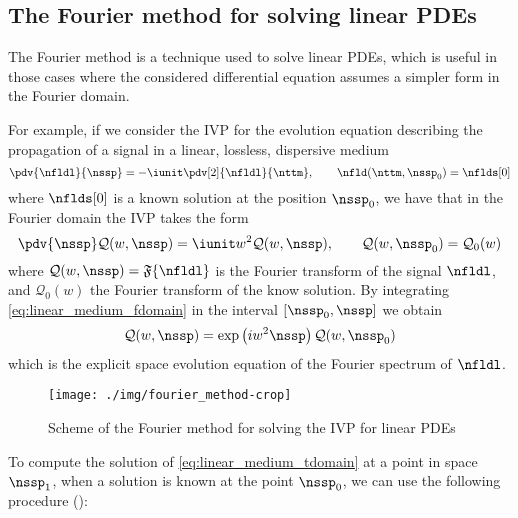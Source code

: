 \subsection{The Fourier method for solving linear \aclp{PDE}}

The Fourier method is a technique used to solve linear \acp{PDE}, which is useful in those cases where the considered differential equation assumes a simpler form in the Fourier domain.

For example, if we consider the \ac{IVP} for the evolution equation describing the
propagation of a signal in a linear, lossless, dispersive medium
\cite{hasegawa1995solitons}
\begin{equation}\label{eq:linear_medium_tdomain}
 \pdv{\nfldl}{\nssp} = -\iunit \pdv[2]{\nfldl}{\nttm}, \qquad \nfld(\nttm, \nssp_0) = \nflds[0]
\end{equation}
where $\nflds[0]$ is a known solution at the position $\nssp_0$, we have that in the Fourier domain the \ac{IVP} takes the form
\begin{equation}\label{eq:linear_medium_fdomain}
 \pdv{\nssp} \mathcal{Q}(w,\nssp) = \iunit w^2 \mathcal{Q}(w,\nssp), \qquad \mathcal{Q}(w,\nssp_0) = \mathcal{Q}_0(w)
\end{equation}
where $\mathcal{Q}(w,\nssp) = \mathfrak{F}\{\nfldl \}$ is the Fourier transform of the signal $\nfldl$, and $\mathcal{Q}_0(w)$ the Fourier transform of the know solution.
By integrating \eqref{eq:linear_medium_fdomain} in the interval $[\nssp_0, \nssp]$ we obtain
\begin{equation}\label{eq:linear_medium_ivp_fdomain}
 \mathcal{Q}(w,\nssp) = \exp \left( i w^2 \nssp \right) \mathcal{Q}(w,\nssp_0)
\end{equation}
which is the explicit space evolution equation of the Fourier spectrum of $\nfldl$.

\begin{figure}[t]
  \centering
  \texttt{[image: ./img/fourier\_method-crop]}
  \caption{Scheme of the Fourier method for solving the \ac{IVP} for linear \acp{PDE}}
  \label{fig:fourier_method}
\end{figure}


To compute the solution of \eqref{eq:linear_medium_tdomain} at a point in space $\nssp_1$, when a solution is known at the point $\nssp_0$, we can use the following procedure ():

